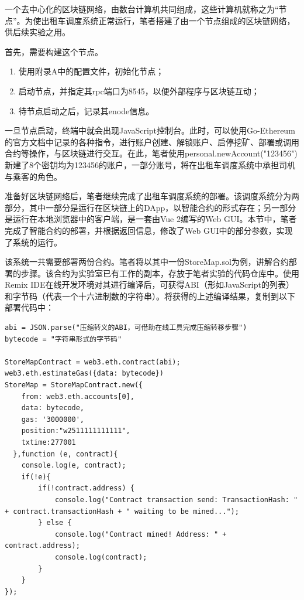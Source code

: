 一个去中心化的区块链网络，由数台计算机共同组成，这些计算机就称之为“节点”。为使出租车调度系统正常运行，笔者搭建了由一个节点组成的区块链网络，供后续实验之用。

首先，需要构建这个节点。

\begin{enumerate}
    \item 使用附录A中的配置文件，初始化节点；
    \item 启动节点，并指定其rpc端口为8545，以便外部程序与区块链互动；
    \item 待节点启动之后，记录其enode信息。
\end{enumerate}

一旦节点启动，终端中就会出现JavaScript控制台。此时，可以使用Go-Ethereum的官方文档中记录的各种指令，进行账户创建、解锁账户、启停挖矿、部署或调用合约等操作，与区块链进行交互。在此，笔者使用personal.newAccount("123456")新建了8个密钥均为123456的账户，一部分账号，将在出租车调度系统中承担司机与乘客的角色。

准备好区块链网络后，笔者继续完成了出租车调度系统的部署。该调度系统分为两部分，其中一部分是运行在区块链上的DApp，以智能合约的形式存在；另一部分是运行在本地浏览器中的客户端，是一套由Vue 2编写的Web GUI。本节中，笔者完成了智能合约的部署，并根据返回信息，修改了Web GUI中的部分参数，实现了系统的运行。

该系统一共需要部署两份合约。笔者将以其中一份StoreMap.sol为例，讲解合约部署的步骤。该合约为实验室已有工作的副本，存放于笔者实验的代码仓库中。使用Remix IDE在线开发环境对其进行编译后，可获得ABI（形如JavaScript的列表）和字节码（代表一个十六进制数的字符串）。将获得的上述编译结果，复制到以下部署代码中：

\begin{lstlisting}[caption={合约部署代码}]
abi = JSON.parse("压缩转义的ABI，可借助在线工具完成压缩转移步骤")
bytecode = "字符串形式的字节码"

StoreMapContract = web3.eth.contract(abi);
web3.eth.estimateGas({data: bytecode})
StoreMap = StoreMapContract.new({
    from: web3.eth.accounts[0],
    data: bytecode,
    gas: '3000000',
    position:"w2511111111111",
    txtime:277001
  },function (e, contract){
    console.log(e, contract);
    if(!e){
        if(!contract.address) {
            console.log("Contract transaction send: TransactionHash: " + contract.transactionHash + " waiting to be mined...");
        } else {
            console.log("Contract mined! Address: " + contract.address);
            console.log(contract);
        }
    }
});
\end{lstlisting}

